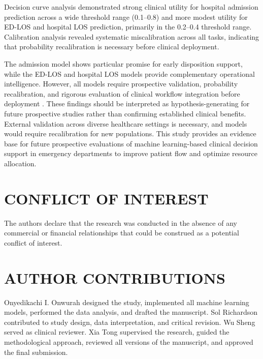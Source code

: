 \documentclass[harvard,article]{frontiersinFPHY_FAMS}
\begin{document}
Decision curve analysis demonstrated strong clinical utility for hospital admission prediction across a wide threshold range (0.1--0.8) and more modest utility for ED-LOS and hospital LOS prediction, primarily in the 0.2--0.4 threshold range. Calibration analysis revealed systematic miscalibration across all tasks, indicating that probability recalibration is necessary before clinical deployment.

The admission model shows particular promise for early disposition support, while the ED-LOS and hospital LOS models provide complementary operational intelligence. However, all models require prospective validation, probability recalibration, and rigorous evaluation of clinical workflow integration before deployment \cite{zikos2018}. These findings should be interpreted as hypothesis-generating for future prospective studies rather than confirming established clinical benefits. External validation across diverse healthcare settings is necessary, and models would require recalibration for new populations. This study provides an evidence base for future prospective evaluations of machine learning-based clinical decision support in emergency departments to improve patient flow and optimize resource allocation.

\section{CONFLICT OF INTEREST}

The authors declare that the research was conducted in the absence of any commercial or financial relationships that could be construed as a potential conflict of interest.

\section{AUTHOR CONTRIBUTIONS}

Onyedikachi I. Onwurah designed the study, implemented all machine learning models, performed the data analysis, and drafted the manuscript. Sol Richardson contributed to study design, data interpretation, and critical revision. Wu Sheng served as clinical reviewer. Xia Tong supervised the research, guided the methodological approach, reviewed all versions of the manuscript, and approved the final submission.
\end{document}
